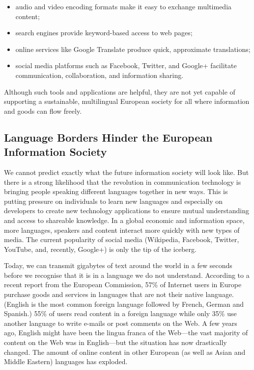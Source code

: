 \documentclass[]{../../metanetpaper}
\begin{document}
\begin{multicols}{2}
\begin{itemize}
\item audio and video encoding formats make it easy to exchange multimedia content;

\item search engines provide keyword-based access to web pages;

\item online services like Google Translate produce quick, approximate translations;

\item social media platforms such as Facebook, Twitter, and Google+ facilitate
communication, collaboration, and information sharing.
\end{itemize}

Although such tools and applications are helpful, they are not yet capable of
supporting a sustainable, multilingual European society for all where
information and goods can flow freely.

\subsection{Language Borders Hinder the European Information Society}

We cannot predict exactly what the future information society will
look like.  But there is a strong likelihood that the revolution in
communication technology is bringing people speaking different
languages together in new ways. This is putting pressure on
individuals to learn new languages and especially on developers to
create new technology applications to ensure mutual understanding and
access to shareable knowledge. In a global economic and information
space, more languages, speakers and content interact more quickly with
new types of media. The current popularity of social media (Wikipedia,
Facebook, Twitter, YouTube, and, recently, Google+) is only the tip of
the iceberg.

Today, we can transmit gigabytes of text around the world in a few
seconds before we recognise that it is in a language we do not
understand. According to a recent report from the European Commission,
57\% of Internet users in Europe purchase goods and services in
languages that are not their native language. (English is the most
common foreign language followed by French, German and Spanish.) 55\%
of users read content in a foreign language while only 35\% use
another language to write e-mails or post comments on the
Web. \cite{EC-prefer} A few years ago, English might have been the
lingua franca of the Web—the vast majority of content on the Web was
in English—but the situation has now drastically changed. The amount
of online content in other European (as well as Asian and Middle
Eastern) languages has exploded.


\end{multicols}
\end{document}
